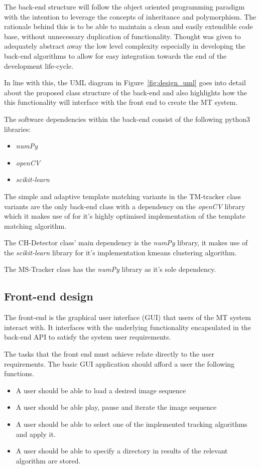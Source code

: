 The back-end structure will follow the object oriented programming paradigm with
the intention to leverage the concepts of inheritance and polymorphism. The
rationale behind this is to be able to maintain a clean and easily extendible
code base, without unnecessary duplication of functionality. Thought was given
to adequately abstract away the low level complexity especially in developing
the back-end algorithms to allow for easy integration towards the end of the
development life-cycle. 

In line with this, the UML diagram in Figure~\ref{fig:design_uml} goes into
detail about the proposed class structure of the back-end and also highlights how the 
this functionality will interface with the front end to create the MT system.


The software dependencies within the back-end consist of the following python3
libraries:
\begin{itemize}
    \item \textit{numPy}
    \item \textit{openCV}
    \item \textit{scikit-learn}
\end{itemize}

The simple and adaptive template matching variants in the TM-tracker class variants are the only
back-end class with a dependency on the \textit{openCV} library which it makes use of for it's
highly optimised implementation of the template matching algorithm.

The CH-Detector class' main dependency is the \textit{numPy} library, it makes
use of the \textit{scikit-learn} library for it's implementation kmeans clustering
algorithm.

The MS-Tracker class has the \textit{numPy} library as it's sole dependency.

\subsection{Front-end design}
The front-end is the graphical user interface (GUI) that users of the MT
system interact with. 
It interfaces with the underlying functionality encapsulated in the back-end API to
satisfy the system user requirements. 

The tasks that the front end must achieve relate directly to the user
requirements. The basic GUI application should afford a user the following functions.
\begin{itemize}
    \item A user should be able to load a desired image sequence
    \item A user should be able play, pause and iterate the image sequence 
    \item A user should be able to select one of the implemented tracking
        algorithms and apply it.
    \item A user should be able to specify a directory in results of the
        relevant algorithm are stored.
\end{itemize}

